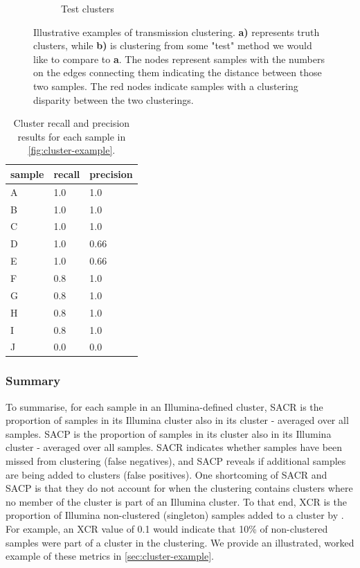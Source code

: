 \begin{figure}
\begin{subfigure}[b]{0.4\textwidth}
         \caption{Test clusters}
         \label{fig:example-test}
     \end{subfigure}
        \caption{Illustrative examples of transmission clustering. \textbf{a)} represents truth clusters, while \textbf{b)} is clustering from some "test" method we would like to compare to \textbf{a}. The nodes represent samples with the numbers on the edges connecting them indicating the distance between those two samples. The red nodes indicate samples with a clustering disparity between the two clusterings.}
        \label{fig:cluster-example}
\end{figure}

\begin{table}
\centering
\begin{tabular}{@{}lll@{}}
\toprule
sample & recall & precision \\ \midrule
A      & 1.0    & 1.0       \\
B      & 1.0    & 1.0       \\
C      & 1.0    & 1.0       \\
D      & 1.0    & 0.66      \\
E      & 1.0    & 0.66      \\
F      & 0.8    & 1.0       \\
G      & 0.8    & 1.0       \\
H      & 0.8    & 1.0       \\
I      & 0.8    & 1.0       \\
J      & 0.0    & 0.0       \\ \bottomrule
\end{tabular}
\caption{Cluster recall and precision results for each sample in \autoref{fig:cluster-example}.}
\label{tab:cluster-example}
\end{table}

\subsubsection{Summary}

To summarise, for each sample in an Illumina-defined cluster, SACR is the proportion of samples in its Illumina cluster also in its \ont{} cluster - averaged over all samples. SACP is the proportion of samples in its \ont{} cluster also in its Illumina cluster - averaged over all samples. SACR indicates whether samples have been missed from \ont{} clustering (false negatives), and SACP reveals if additional samples are being added to \ont{} clusters (false positives). One shortcoming of SACR and SACP is that they do not account for when the \ont{} clustering contains clusters where no member of the cluster is part of an Illumina cluster. To that end, XCR is the proportion of Illumina non-clustered (singleton) samples added to a cluster by \ont{}. For example, an XCR value of 0.1 would indicate that 10\% of non-clustered samples were part of a cluster in the \ont{} clustering. We provide an illustrated, worked example of these metrics in \autoref{sec:cluster-example}.

